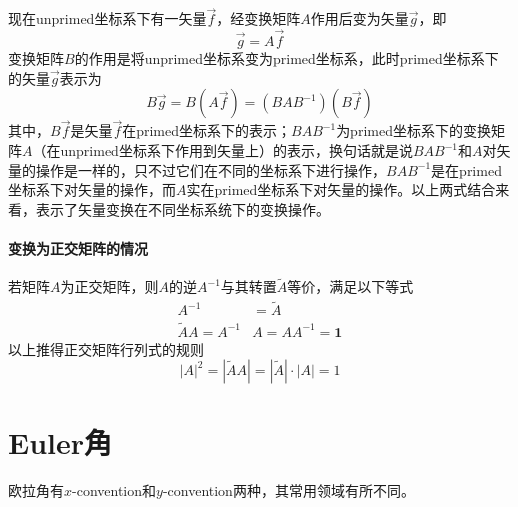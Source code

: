 现在unprimed坐标系下有一矢量$\vec{f}$，经变换矩阵$A$作用后变为矢量$\vec{g}$，即
\begin{equation}
	\vec{g} = A \vec{f}
\end{equation}
变换矩阵$B$的作用是将unprimed坐标系变为primed坐标系，此时primed坐标系下的矢量$\vec{g}$表示为
\begin{equation}
	B\vec{g} = B(A\vec{f}) = (BAB^{-1})(B\vec{f})
\end{equation}
其中，$B\vec{f}$是矢量$\vec{f}$在primed坐标系下的表示；$BAB^{-1}$为primed坐标系下的变换矩阵$A$（在unprimed坐标系下作用到矢量上）的表示，换句话就是说$BAB^{-1}$和$A$对矢量的操作是一样的，只不过它们在不同的坐标系下进行操作，$BAB^{-1}$是在primed坐标系下对矢量的操作，而$A$实在primed坐标系下对矢量的操作。以上两式结合来看，表示了矢量变换在不同坐标系统下的变换操作。


\paragraph*{变换为正交矩阵的情况}
若矩阵$A$为正交矩阵，则$A$的逆$A^{-1}$与其转置$\tilde{A}$等价，满足以下等式
\begin{equation}
	\begin{aligned}
		A^{-1} &= \tilde{A} \\
		\tilde{A}A = A^{-1}&A = AA^{-1} = \bm{1}
        \label{eq:orth-mat-qualification}
	\end{aligned}
\end{equation}
以上推得正交矩阵行列式的规则
\begin{equation}
	|A|^2 = |\tilde{A}A| = |\tilde{A}|\cdot|A| = 1
\end{equation}

\section{Euler角}
欧拉角有$x$-convention和$y$-convention两种，其常用领域有所不同。

